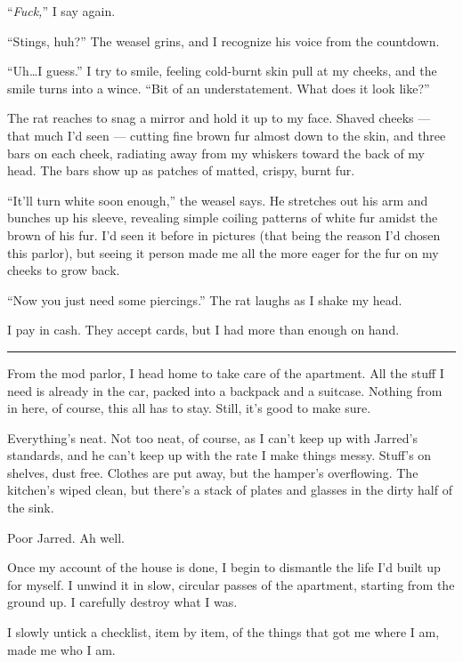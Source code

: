``\emph{Fuck,}'' I say again.

``Stings, huh?'' The weasel grins, and I recognize his voice from the countdown.

``Uh\ldots{}I guess.'' I try to smile, feeling cold-burnt skin pull at my cheeks, and the smile turns into a wince. ``Bit of an understatement. What does it look like?''

The rat reaches to snag a mirror and hold it up to my face. Shaved cheeks --- that much I'd seen --- cutting fine brown fur almost down to the skin, and three bars on each cheek, radiating away from my whiskers toward the back of my head. The bars show up as patches of matted, crispy, burnt fur.

``It'll turn white soon enough,'' the weasel says. He stretches out his arm and bunches up his sleeve, revealing simple coiling patterns of white fur amidst the brown of his fur. I'd seen it before in pictures (that being the reason I'd chosen this parlor), but seeing it person made me all the more eager for the fur on my cheeks to grow back.

``Now you just need some piercings.'' The rat laughs as I shake my head.

I pay in cash. They accept cards, but I had more than enough on hand.

\begin{center}\rule{0.5\linewidth}{\linethickness}\end{center}

From the mod parlor, I head home to take care of the apartment. All the stuff I need is already in the car, packed into a backpack and a suitcase. Nothing from in here, of course, this all has to stay. Still, it's good to make sure.

Everything's neat. Not too neat, of course, as I can't keep up with Jarred's standards, and he can't keep up with the rate I make things messy. Stuff's on shelves, dust free. Clothes are put away, but the hamper's overflowing. The kitchen's wiped clean, but there's a stack of plates and glasses in the dirty half of the sink.

Poor Jarred. Ah well.

Once my account of the house is done, I begin to dismantle the life I'd built up for myself. I unwind it in slow, circular passes of the apartment, starting from the ground up. I carefully destroy what I was.

I slowly untick a checklist, item by item, of the things that got me where I am, made me who I am.

